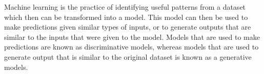 Machine learning is the practice of identifying useful patterns from a dataset which then can be transformed into a model. This model can then be used to make predictions given similar types of inputs, or to generate outputs that are similar to the inputs that were given to the model. Models that are used to make predictions are known as discriminative models, whereas models that are used to generate output that is similar to the original dataset is known as a generative models.
